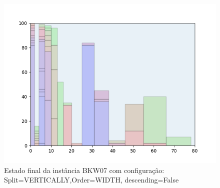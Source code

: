 \begin{figure}[H]
    \centering
    \caption[]{Estado final da instância BKW07 com configuração: Split=VERTICALLY,Order=WIDTH, descending=False}
    \label{fig:bkw07-vertically-width-false}
    \includegraphics[scale=0.5]{output/figures/bkw/bkw07/vertically/width/false/00}
\end{figure}